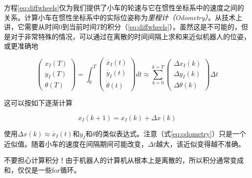 方程\ref{eq:diffwheels}仅为我们提供了小车的轮速与它在惯性坐标系中的速度之间的关系。计算小车在惯性坐标系中的实际位姿称为\emph{里程计（Odometry）}。从技术上讲，它需要从时间$0$到当前时间$T$的积分（\ref{eq:diffwheels}）。虽然这是不可能的，但是对于非常特殊的情况，可以通过在离散的时间间隔上求和来近似机器人的位姿，或更准确地

\begin{equation}
\left(\begin{array}{c} {x_I}(T)\\{y_I}(T)\\{\theta}(T)\end{array}\right)=
\int_0^T \left(\begin{array}{c} \dot{x_I}(t)\\\dot{y_I}(t)\\\dot{\theta}(t)\end{array}\right) dt \approx 
\sum_{k=0}^{k=T}\left(\begin{array}{c} \Delta{x_I}(k)\\\Delta{y_I}(k)\\\Delta{\theta}(k)\end{array}\right)\Delta t
\end{equation} 

这可以按如下逐渐计算

\begin{equation}\label{eq:odometry}
x_I(k+1)=x_I(k)+\Delta x (k)
\end{equation}


使用$\Delta x(k)\approx\dot{x_I}(t)$和$y_I$和$\theta$的类似表达式。注意（式\ref{eq:odometry}）只是一个近似值。随着小车的速度在间隔期间可能改变，$\Delta t$越大，该近似变得越不准确。

\begin{framed}

不要担心计算积分！由于机器人的计算机从根本上是离散的，所以积分通常变成和，仅仅是一些for循环。
\end{framed}



